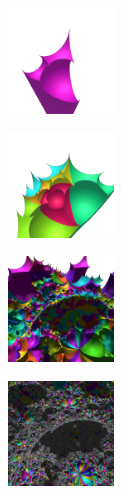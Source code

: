 \documentclass[suppldata, dvipdfmx]{interact}
\theoremstyle{plain}%
\theoremstyle{definition}
\theoremstyle{remark}
\theoremstyle{problemstyle}
\begin{document}
\begin{figure}[h!tbp]
 \begin{minipage}[t]{0.18\textwidth}
  \centering
  \includegraphics[height=1.1in, keepaspectratio]{./img/constructFractal/terrainProcess/step1.jpg}
  \label{fig:terrainStep1}
 \end{minipage}
 \hspace*{\fill}
 \begin{minipage}[t]{0.18\textwidth}
  \centering
  \includegraphics[height=1.1in, keepaspectratio]{./img/constructFractal/terrainProcess/step2.jpg}
  \label{fig:terrainStep2}
 \end{minipage}
 \hspace*{\fill}
 \begin{minipage}[t]{0.18\textwidth}
  \centering
  \includegraphics[height=1.1in, keepaspectratio]{./img/constructFractal/terrainProcess/step5.jpg}
  \label{fig:terrainStep5}
 \end{minipage}
 \hspace*{\fill}
 \begin{minipage}[t]{0.18\textwidth}
  \centering
  \includegraphics[height=1.1in, keepaspectratio]{./img/constructFractal/terrainProcess/step10.jpg}

\end{minipage}
\end{figure}
\end{document}
